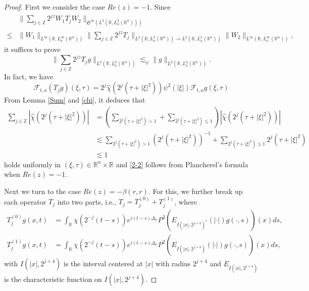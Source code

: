 \documentclass[a4paper,11pt, reqno]{amsart}
\numberwithin{equation}{section}
\theoremstyle{plain}
\theoremstyle{definition}
\theoremstyle{remark}
\begin{document}
\begin{proof}
First we consider the case $Re(z)=-1$.  Since
\begin{align*}
	&\big\|\sum\limits_{j\in\mathbb{Z}} 2^{jz}W_1T_jW_2\big\|_{\mathfrak{S}^\infty(L^2(\mathbb{R}, L_\kappa^2(\mathbb{R}^n)))}\\
 \leq &\big\|W_1\big\|_{L^\infty(\mathbb{R}, L_\kappa^\infty(\mathbb{R}^n))} \|\sum\limits_{j\in\mathbb{Z}} 2^{jz}T_j\|_{L^2(\mathbb{R}, L_\kappa^2(\mathbb{R}^n))\rightarrow L^2(\mathbb{R}, L_\kappa^2(\mathbb{R}^n))}\big\|W_2\big\|_{L^\infty(\mathbb{R}, L_\kappa^\infty(\mathbb{R}^n))},
		\end{align*}
it suffices to prove
\begin{equation}\label{2-2}
   \|\sum\limits_{j\in\mathbb{Z}} 2^{jz}T_jg\|_{L^2(\mathbb{R}, L_\kappa^2(\mathbb{R}^n))}\lesssim_\psi \|g\|_{L^2(\mathbb{R}, L_\kappa^2(\mathbb{R}^n))}.
\end{equation}
In fact, we have
\begin{equation*}
     \mathcal{F}_{t,\kappa}(T_jg)(\xi,\tau)=2^j\widehat{\chi}\left(2^j(\tau+|\xi|^2)\right)\psi^2(|\xi|)\mathcal{F}_{t,\kappa}g(\xi,\tau)
\end{equation*}
From Lemma \ref{Sum} and \eqref{chi}, it deduces that
\begin{align*}
    \sum\limits_{j\in\mathbb{Z}} \left|\widehat{\chi}\left(2^j(\tau+|\xi|^2)\right)\right|&=\left(\sum\limits_{2^j(\tau+|\xi|^2)>1} +\sum\limits_{2^j(\tau+|\xi|^2)\leq 1}\right)\left|\widehat{\chi}\left(2^j(\tau+|\xi|^2)\right)\right|\\
    &\lesssim \sum\limits_{2^j(\tau+|\xi|^2)>1} \left(2^j(\tau+|\xi|^2)\right)^{-1}+\sum\limits_{2^j(\tau+|\xi|^2)\leq 1} 2^j(\tau+|\xi|^2)\\
    &\lesssim 1
\end{align*}
holds uniformly in $(\xi,\tau)\in\mathbb{R}^n\times\mathbb{R}$ and \eqref{2-2} follows from Plancherel's formula when $Re(z)=-1$.

Next we turn to the case $Re(z)=-\beta(r,r)$. For this, we further break up each operator $T_j$ into two parts, i.e., $T_j=T^{(0)}_j+T^{(1)}_j$, where
\begin{align*}
    T^{(0)}_jg(x,t)&=\int_\mathbb{R} \chi\left(2^{-j}(t-s)\right)e^{i(t-s)\Delta_\kappa}P^2\left(E_{I(|x|,2^{j+4})^c}(|\cdot|) g(\cdot,s)\right)(x)ds,\\
    T^{(1)}_jg(x,t)&=\int_\mathbb{R} \chi\left(2^{-j}(t-s)\right)e^{i(t-s)\Delta_\kappa}P^2\left(E_{I(|x|,2^{j+4})}(|\cdot|) g(\cdot,s)\right)(x)ds,
\end{align*}
with  $I(|x|,2^{j+4})$ is the interval centered at $|x|$ with radius $2^{j+4}$ and $E_{I(|x|,2^{j+4})}$ is the characteristic function on $I(|x|,2^{j+4})$.


\end{proof}
\end{document}
